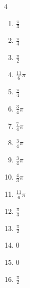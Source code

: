 \begin{multicols}{4}
\begin{enumerate}
  \item $\displaystyle \frac{\pi}{3}$

  \item $\displaystyle \frac{\pi}{4}$

  \item $\displaystyle \frac{\pi}{2}$

  \item $\displaystyle \frac{11}{6}\pi$

  \item $\displaystyle \frac{\pi}{4}$

  \item $\displaystyle \frac{3}{4}\pi$

  \item $\displaystyle \frac{7}{4}\pi$

  \item $\displaystyle \frac{3}{4}\pi$

  \item $\displaystyle \frac{3}{4}\pi$

  \item $\displaystyle \frac{4}{3}\pi$

  \item $\displaystyle \frac{11}{6}\pi$

  \item $\displaystyle \frac{\pi}{3}$

  \item $\displaystyle \frac{\pi}{2}$

  \item $\displaystyle 0$

  \item $\displaystyle 0$

  \item $\displaystyle \frac{\pi}{2}$


\end{enumerate}
\end{multicols}
